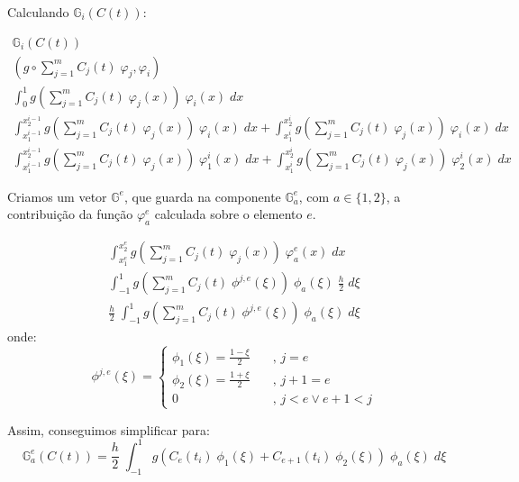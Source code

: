 \documentclass[a4paper]{article}
\newcommand{\vphi}{\varphi}
\begin{document}
Calculando \(\mathbb{G}_{i}(C(t))\):

\[ \begin{array}{l} \displaystyle
    \mathbb{G}_{i}(C(t))
    \\ \displaystyle
    \left( g \circ \sum_{j=1}^m{ C_j(t) \; \vphi_j }, \vphi_i \right)
    \\ \displaystyle
    \int_0^1{
        g\left(\sum_{j=1}^m{ C_j(t) \; \vphi_j(x) }\right) \; \vphi_i(x)
    \;dx}
    \\ \displaystyle
    \int_{x^{i-1}_1}^{x^{i-1}_2}{
        g\left(\sum_{j=1}^m{ C_j(t) \; \vphi_j(x) }\right) \; \vphi_i(x)
    \;dx}
    + \int_{x^i_1}^{x^i_2}{
        g\left(\sum_{j=1}^m{ C_j(t) \; \vphi_j(x) }\right) \; \vphi_i(x)
    \;dx}
    \\ \displaystyle
    \int_{x^{i-1}_1}^{x^{i-1}_2}{
        g\left(\sum_{j=1}^m{ C_j(t) \; \vphi_j(x) }\right) \; \vphi^i_1(x)
    \;dx}
    + \int_{x^i_1}^{x^i_2}{
        g\left(\sum_{j=1}^m{ C_j(t) \; \vphi_j(x) }\right) \; \vphi^i_2(x)
    \;dx}
\end{array} \]

Criamos um vetor \(\mathbb{G}^e\),
que guarda na componente \(\mathbb{G}^e_a\),
com \(a \in \{ 1, 2 \}\),
a contribuição da função \(\vphi^e_a\)
calculada sobre o elemento \(e\).

\[ \begin{array}{l} \displaystyle
    \int_{x^e_1}^{x^e_2}{
        g\left(\sum_{j=1}^m{ C_j(t) \; \vphi_j(x) }\right) \; \vphi^e_a(x)
    \;dx}
    \\ \displaystyle
    \int_{-1}^1{
        g\left(\sum_{j=1}^m{ C_j(t) \; \phi^{j,e}(\xi) }\right) \; \phi_a(\xi)
        \; \frac{h}{2}
    \;d\xi}
    \\ \displaystyle
    \frac{h}{2} \; \int_{-1}^1{
        g\left(\sum_{j=1}^m{ C_j(t) \; \phi^{j,e}(\xi) }\right) \; \phi_a(\xi)
    \;d\xi}
\end{array} \]
onde:
\[
    \phi^{j,e}(\xi) = \begin{cases}
        \phi_1(\xi) = \frac{1 - \xi}{2}
            &\quad\text{, } j = e
        \\
        \phi_2(\xi) = \frac{1 + \xi}{2}
            &\quad\text{, } j + 1 = e
        \\
        0
            &\quad\text{, } j < e \lor e + 1 < j
    \end{cases}
\]

Assim, conseguimos simplificar para:
\[
    \mathbb{G}^e_a(C(t)) =
    \frac{h}{2} \; \int_{-1}^1{
        g(C_e(t_i) \; \phi_1(\xi) + C_{e+1}(t_i) \; \phi_2(\xi)) \; \phi_a(\xi)
    \;d\xi}
\]
\end{document}
